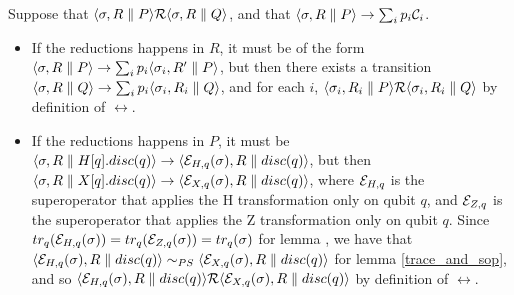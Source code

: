Suppose that $\langle\sigma, R \parallel P\rangle \mathcal{R} \langle\sigma, R \parallel Q\rangle$, and that $\langle\sigma, R \parallel P\rangle \rightarrow \sum_i p_i \mathcal{C}_i$.\begin{itemize}
\item If the reductions happens in $R$, it must be of the form $\langle\sigma, R \parallel P\rangle \rightarrow \sum_i p_i \langle\sigma_i, R' \parallel P\rangle$, but then there exists a transition $\langle\sigma, R \parallel Q\rangle \rightarrow \sum_i p_i \langle\sigma_i, R_i \parallel Q\rangle$, and for each $i$, $\langle\sigma_i, R_i \parallel P\rangle \mathcal{R} \langle\sigma_i, R_i \parallel Q\rangle$ by definition of $\rel$.
\item If the reductions happens in $P$, it must be 
 $\langle\sigma, R \parallel H[q].disc(q)\rangle \rightarrow \langle\mathcal{E}_{H, q}(\sigma), R \parallel disc(q)\rangle$, but then  $\langle\sigma, R \parallel X[q].disc(q)\rangle \rightarrow \langle\mathcal{E}_{X, q}(\sigma), R \parallel disc(q)\rangle$, where $\mathcal{E}_{H, q}$ is the superoperator that applies the H transformation only on qubit $q$, and $\mathcal{E}_{Z, q}$ is the superoperator that applies the Z transformation only on qubit $q$. 
Since $tr_q(\mathcal{E}_{H, q}(\sigma)) = tr_q(\mathcal{E}_{Z, q}(\sigma)) = tr_q(\sigma)$ for lemma , we have that $\langle\mathcal{E}_{H, q}(\sigma), R \parallel disc(q)\rangle \sim_{PS} \langle\mathcal{E}_{X, q}(\sigma), R \parallel disc(q)\rangle$ for lemma \ref{trace_and_sop}, and so $\langle\mathcal{E}_{H, q}(\sigma), R \parallel disc(q)\rangle \mathcal{R} \langle\mathcal{E}_{X, q}(\sigma), R \parallel disc(q)\rangle$ by definition of $\rel$.
 
\end{itemize}
